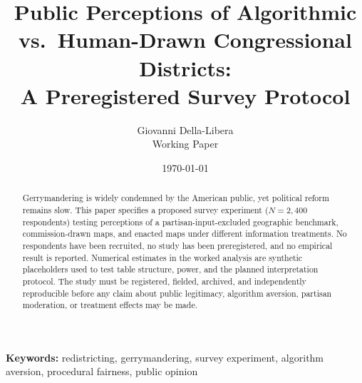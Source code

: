 \documentclass[12pt]{article}
\title{Public Perceptions of Algorithmic vs.\ Human-Drawn Congressional Districts:\\
A Preregistered Survey Protocol}
\author{
Giovanni Della-Libera\\
\small{Working Paper}
}
\date{\today}
\begin{document}
\maketitle

\noindent{}
\vspace{1em}

\begin{abstract}
Gerrymandering is widely condemned by the American public, yet political
reform remains slow. This paper specifies a proposed survey experiment
($N=2{,}400$ respondents) testing perceptions of a
partisan-input-excluded geographic benchmark, commission-drawn maps, and
enacted maps under different information treatments. No respondents have been
recruited, no study has been preregistered, and no empirical result is reported.
Numerical estimates in the worked analysis are synthetic placeholders used to
test table structure, power, and the planned interpretation protocol. The
study must be registered, fielded, archived, and independently reproducible
before any claim about public legitimacy, algorithm aversion, partisan
moderation, or treatment effects may be made.
\end{abstract}

\noindent\textbf{Keywords:} redistricting, gerrymandering, survey experiment, algorithm aversion, procedural fairness, public opinion











\end{document}
